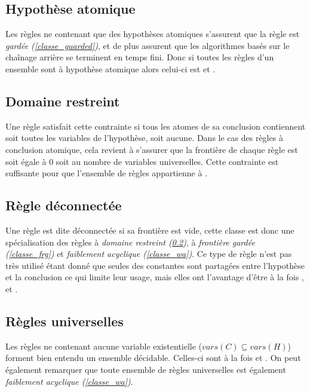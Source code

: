 \subsection{Hypothèse atomique}\label{classe_ah}
Les règles ne contenant que des hypothèses atomiques s'assurent que la règle est {\em
gardée (\ref{classe_guarded})}, et de plus assurent que les algorithmes basés sur le 
chaînage arrière se terminent en temps fini.
Donc si toutes les règles d'un ensemble sont à hypothèse atomique alors celui-ci est \gbts et
\fus.

\subsection{Domaine restreint}\label{classe_dr}
Une règle satisfait cette contrainte si tous les atomes de sa conclusion
contiennent soit toutes les variables de l'hypothèse, soit aucune.
Dans le cas des règles à conclusion atomique, cela revient à s'assurer que la frontière
de chaque règle est soit égale à 0 soit au nombre de variables universelles.
Cette contrainte est suffisante pour que l'ensemble de règles appartienne à \fus.


\subsection{Règle déconnectée}\label{classe_disc}
Une règle est dite déconnectée si sa frontière est vide, cette classe est donc une
spécialisation des règles à {\em domaine restreint (\ref{classe_dr})}, à {\em frontière
gardée (\ref{classe_frg})} et {\em faiblement acyclique (\ref{classe_wa})}.
Ce type de règle n'est pas très utilisé étant donné que seules des constantes sont
partagées entre l'hypothèse et la conclusion ce qui limite leur usage, mais elles ont
l'avantage d'être à la fois \fes, \gbts et \fus.

\subsection{Règles universelles}\label{classe_rr}
Les règles ne contenant aucune variable existentielle ($vars(C) \subseteq vars(H)$) forment bien entendu
un ensemble décidable. Celles-ci sont à la fois \fes et \gbts. On peut également
remarquer que toute ensemble de règles universelles est également {\em faiblement
acyclique (\ref{classe_wa})}.

